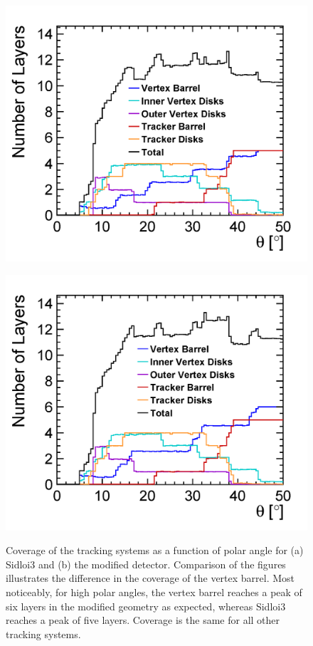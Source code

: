 \begin{figure}
\begin{minipage}{.5\textwidth}
\centering
\includegraphics[width=\textwidth]{trackerCoverage_sidloi3.png}
\label{fig:coveragea}
\end{minipage}%
\begin{minipage}{.5\textwidth}
\includegraphics[width=\textwidth]{trackerCoverage_det_vtxbar_3doublet.png}
\label{fig:coverageb}
\end{minipage}
\caption{Coverage of the tracking systems as a function of polar angle for (a) Sidloi3 and (b) the modified detector.
Comparison of the figures illustrates the difference in the coverage of the vertex barrel.
Most noticeably, for high polar angles, the vertex barrel reaches a peak of six layers in the modified geometry as expected,
whereas Sidloi3 reaches a peak of five layers. Coverage is the same for all other tracking systems.}
\label{fig:coverage}
\end{figure}

